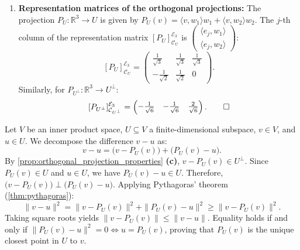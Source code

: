 \begin{exercisesolution*}
\begin{enumerate}[label=\textbf{(\alph*)}]
    \item \textbf{Representation matrices of the orthogonal projections:}
    The projection $P_U \colon \mathbb{R}^3 \to U$ is given by $P_U(v) = \langle v, w_1 \rangle w_1 + \langle v, w_2 \rangle w_2$.
    The $j$-th column of the representation matrix $[P_U]_{\mathcal{C}_U}^{\mathcal{E}_3}$ is $\left(\begin{smallmatrix} \langle e_j, w_1 \rangle \\ \langle e_j, w_2 \rangle \end{smallmatrix}\right)$:
    \[
    [P_U]_{\mathcal{C}_U}^{\mathcal{E}_3} = \begin{pmatrix}
      \frac{1}{\sqrt{3}} & \frac{1}{\sqrt{3}} & \frac{1}{\sqrt{3}} \\
      -\frac{1}{\sqrt{2}} & \frac{1}{\sqrt{2}} & 0
    \end{pmatrix}.
    \]
    Similarly, for $P_{U^\perp} \colon \mathbb{R}^3 \to U^\perp$:
    \[
    [P_{U^\perp}]_{\mathcal{C}_{U^\perp}}^{\mathcal{E}_3} = \begin{pmatrix}
      -\frac{1}{\sqrt{6}} & -\frac{1}{\sqrt{6}} & \frac{2}{\sqrt{6}}
    \end{pmatrix}. \qedhere
    \]
\end{enumerate}
\end{exercisesolution*}

\begin{exercisesolution}
\label{sol:best_approximation_subspace}
Let $V$ be an inner product space, $U \subseteq V$ a finite-di\-men\-sional subspace, $v \in V$, and $u \in U$.
We decompose the difference $v - u$ as:
\[
v - u = \big(v - P_U(v)\big) + \big(P_U(v) - u\big).
\]
By \cref{prop:orthogonal_projection_properties} \textbf{(c)}, $v - P_U(v) \in U^\perp$.
Since $P_U(v) \in U$ and $u \in U$, we have $P_U(v) - u \in U$.
Therefore, $\big(v - P_U(v)\big) \perp \big(P_U(v) - u\big)$.
Applying Pythagoras' theorem (\cref{thm:pythagoras}):
\[
\|v - u\|^2 = \|v - P_U(v)\|^2 + \|P_U(v) - u\|^2 \ge \|v - P_U(v)\|^2.
\]
Taking square roots yields $\|v - P_U(v)\| \le \|v - u\|$.
Equality holds if and only if $\|P_U(v) - u\|^2 = 0 \iff u = P_U(v)$, proving that $P_U(v)$ is the unique closest point in $U$ to $v$.
\end{exercisesolution}

